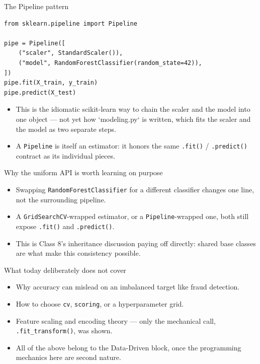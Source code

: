 \begin{frame}[fragile]{The Pipeline pattern}
\begin{lstlisting}[style=coursepython]
from sklearn.pipeline import Pipeline

pipe = Pipeline([
    ("scaler", StandardScaler()),
    ("model", RandomForestClassifier(random_state=42)),
])
pipe.fit(X_train, y_train)
pipe.predict(X_test)
\end{lstlisting}
\begin{itemize}
\item This is the idiomatic scikit-learn way to chain the scaler and the model into one object --- not yet how `modeling.py` is written, which fits the scaler and the model as two separate steps.
\item A \texttt{Pipeline} is itself an estimator: it honors the same \texttt{.fit()} / \texttt{.predict()} contract as its individual pieces.
\end{itemize}
\coursefooter
\end{frame}

\begin{frame}{Why the uniform API is worth learning on purpose}
\begin{itemize}
\item Swapping \texttt{RandomForestClassifier} for a different classifier changes one line, not the surrounding pipeline.
\item A \texttt{GridSearchCV}-wrapped estimator, or a \texttt{Pipeline}-wrapped one, both still expose \texttt{.fit()} and \texttt{.predict()}.
\item This is Class 8's inheritance discussion paying off directly: shared base classes are what make this consistency possible.
\end{itemize}
\coursefooter
\end{frame}

\begin{frame}{What today deliberately does not cover}
\begin{itemize}
\item Why accuracy can mislead on an imbalanced target like fraud detection.
\item How to choose \texttt{cv}, \texttt{scoring}, or a hyperparameter grid.
\item Feature scaling and encoding theory --- only the mechanical call, \texttt{.fit\_transform()}, was shown.
\item All of the above belong to the Data-Driven block, once the programming mechanics here are second nature.
\end{itemize}
\coursefooter
\end{frame}

